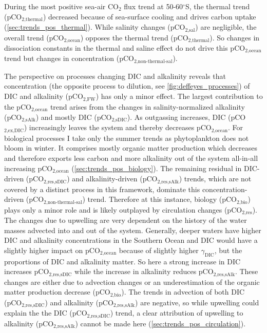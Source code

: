 During the most positive sea-air CO$_2$ flux trend at 50-60$^\circ$S, the thermal trend (pCO$_{\text{2,thermal}}$) decreased because of sea-surface cooling and drives carbon uptake (\autoref{sec:trends_pos_thermal}). While salinity changes (pCO$_{\text{2,sal}}$) are negligible, the overall trend (pCO$_{\text{2,ocean}}$) opposes the thermal trend (pCO$_{\text{2,thermal}}$). So changes in dissociation constants in the thermal and saline effect do not drive this pCO$_{\text{2,ocean}}$ trend but changes in concentration (pCO$_{\text{2,non-thermal-sal}}$).

The perspective on processes changing \acs{DIC} and alkalinity reveals that concentration (the opposite process to dilution, see \autoref{fig:deffeyes_processes}) of \acs{DIC} and alkalinity (pCO$_{\text{2,FW}}$) has only a minor effect. The largest contribution to the pCO$_{\text{2,ocean}}$ trend arises from the changes in salinity-normalized alkalinity (pCO$_{\text{2,sAlk}}$) and mostly \acs{DIC} (pCO$_{\text{2,sDIC}}$). As outgassing increases, \acs{DIC} (pCO$_{\text{2,ex,DIC}}$) increasingly leaves the system and thereby decreases pCO$_{\text{2,ocean}}$. For biological processes I take only the summer trends as phytoplankton does not bloom in winter. It comprises mostly organic matter production which decreases and therefore exports less carbon and more alkalinity out of the system all-in-all increasing pCO$_{\text{2,ocean}}$ (\autoref{sec:trends_pos_biology}). The remaining residual in \acs{DIC}-driven (pCO$_{\text{2,res,sDIC}}$) and alkalinity-driven (pCO$_{\text{2,res,sAlk}}$) trends, which are not covered by a distinct process in this framework, dominate this concentration-driven (pCO$_{\text{2,non-thermal-sal}}$) trend. Therefore at this instance, biology (pCO$_{\text{2,bio}}$) plays only a minor role and is likely outplayed by circulation changes (pCO$_{\text{2,res}}$). The changes due to upwelling are very dependent on the history of the water masses advected into and out of the system. Generally, deeper waters have higher \acs{DIC} and alkalinity concentrations in the Southern Ocean and \acs{DIC} would have a slightly higher impact on pCO$_{\text{2,ocean}}$ because of slightly higher $\gamma_{\text{DIC}}$, but the proportions of \acs{DIC} and alkalinity matter. So here a strong increase in \acs{DIC} increases pCO$_{\text{2,res,sDIC}}$ while the increase in alkalinity reduces pCO$_{\text{2,res,sAlk}}$. These changes are either due to advection changes or an underestimation of the organic matter production decrease (pCO$_{\text{2,bio}}$). The trends in advection of both \acs{DIC} (pCO$_{\text{2,res,sDIC}}$) and alkalinity (pCO$_{\text{2,res,sAlk}}$) are negative, so while upwelling could explain the the \acs{DIC} (pCO$_{\text{2,res,sDIC}}$) trend, a clear attribution of upwelling to alkalinity (pCO$_{\text{2,res,sAlk}}$) cannot be made here (\autoref{sec:trends_pos_circulation}).\newline

